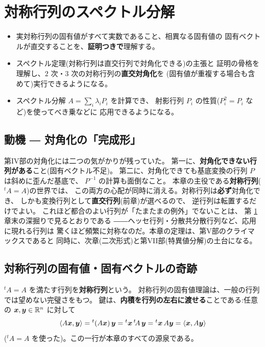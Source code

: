 \chapter{対称行列のスペクトル分解}\label{chap:spectral}

\begin{goal}
\begin{itemize}
\item 実対称行列の固有値がすべて実数であること、相異なる固有値の
固有ベクトルが直交することを、\textbf{証明つきで}理解する。
\item スペクトル定理(対称行列は直交行列で対角化できる)の主張と
証明の骨格を理解し、$2$ 次・$3$ 次の対称行列の\textbf{直交対角化}を
(固有値が重複する場合も含めて)実行できるようになる。
\item スペクトル分解 $A = \sum_i \lambda_i P_i$ を計算でき、
射影行列 $P_i$ の性質($P_i^2 = P_i$ など)を使ってべき乗などに
応用できるようになる。
\end{itemize}
\end{goal}

\section{動機 ― 対角化の「完成形」}

第IV部の対角化には二つの気がかりが残っていた。
第一に、\textbf{対角化できない行列がある}こと(固有ベクトル不足)。
第二に、対角化できても基底変換の行列 $P$ は斜めに歪んだ基底で、
$P^{-1}$ の計算も面倒なこと。
本章の主役である\textbf{対称行列}(${}^t\!A = A$)の世界では、
この両方の心配が同時に消える。対称行列は\textbf{必ず}対角化でき、
しかも変換行列として\textbf{直交行列}(前章)が選べるので、
逆行列は転置するだけでよい。
これほど都合のよい行列が「たまたまの例外」でないことは、
第 \ref{chap:spectral} 章末の深掘りで見るとおりである
――ヘッセ行列・分散共分散行列など、応用に現れる行列は
驚くほど頻繁に対称なのだ。本章の定理は、第V部のクライマックスであると
同時に、次章(二次形式)と第VII部(特異値分解)の土台になる。

\section{対称行列の固有値・固有ベクトルの奇跡}

${}^t\!A = A$ を満たす行列を\textbf{対称行列}という。
対称行列の固有値理論は、一般の行列では望めない完璧さをもつ。
鍵は、\textbf{内積を行列の左右に渡せる}ことである:任意の
$\bm{x}, \bm{y} \in \mathbb{R}^n$ に対して
\[
\langle A\bm{x}, \bm{y} \rangle = {}^t(A\bm{x})\,\bm{y}
= {}^t\bm{x}\,{}^t\!A\,\bm{y} = {}^t\bm{x}\,A\bm{y}
= \langle \bm{x}, A\bm{y} \rangle
\]
(${}^t\!A = A$ を使った)。この一行が本章のすべての源泉である。

